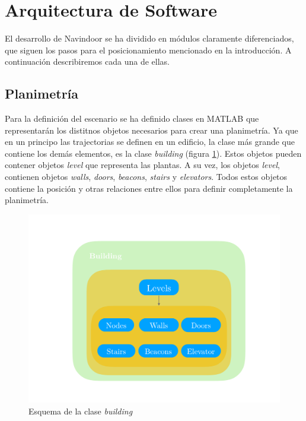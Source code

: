 \section{Arquitectura de Software}

El desarrollo de Navindoor se ha dividido en módulos claramente diferenciados, que siguen los pasos para el posicionamiento mencionado en la introducción. A continuación describiremos cada una de ellas.





\subsection{Planimetría}


Para la definición del escenario se ha definido clases en MATLAB que representarán los distitnos objetos necesarios para crear una planimetría.  Ya que en un principo las trajectorias se definen en un edificio, la clase más grande que contiene los demás elementos, es la clase \emph{building} (figura \ref{fig:esquemabuilding}). Estos objetos pueden contener objetos \emph{level} que representa las plantas. A su vez, los objetos \emph{level}, contienen objetos \emph{walls}, \emph{doors}, \emph{beacons}, \emph{stairs} y \emph{elevators}.  Todos estos objetos contiene la posición y otras relaciones entre ellos para definir completamente la planimetría. 


\begin{figure}[!ht]
    \includegraphics[width=1.0\columnwidth]{img/Design/1.pdf}
    \caption[]{Esquema de la clase \emph{building}}
    \label{fig:esquemabuilding}
\end{figure}

